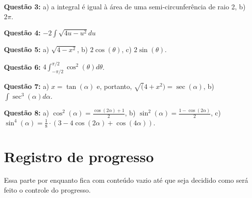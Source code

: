 \documentclass[main_estudante.tex]{subfiles}
\begin{document}
\noindent\textbf{Questão 3:} a) a integral é igual à área de uma semi-circunferência de raio 2, b) $2\pi$.

\noindent\textbf{Questão 4:} $-2\int\sqrt{4u-u^2}du$

\noindent\textbf{Questão 5:} a) $\sqrt{4-x^2}$, b) $2\cos(\theta)$, c) $2\sin(\theta)$.

\noindent\textbf{Questão 6:} $4 \int_{-\pi/2}^{\pi/2} \cos^2(\theta)d\theta$.

\noindent\textbf{Questão 7:} a) $x=\tan(\alpha)$ e, portanto, $\sqrt(4+x^2)=\sec(\alpha)$, b) $\int \sec^3(\alpha)d\alpha$.

\noindent\textbf{Questão 8:} a) $\cos^2(\alpha)=\frac{\cos(2\alpha)+1}{2}$, b) $\sin^2(\alpha)=\frac{1-\cos(2\alpha)}{2}$, c) $\sin^4(\alpha)=\frac{1}{8} \cdot (3-4\cos(2\alpha)+\cos(4\alpha))$.


\section{Registro de progresso}

Essa parte por enquanto fica com conteúdo vazio até que seja decidido como será feito o controle do progresso.

\vspace{5cm}
\end{document}
